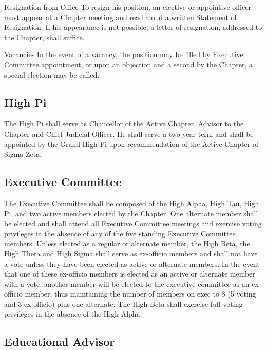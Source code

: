 \documentclass{article}
\begin{document}
\begin{subsubsectionList}
  \item {\titleStyle Resignation from Office\titleSuffix}
  To resign his position, an elective or appointive officer must appear at a
  Chapter meeting and read aloud a written Statement of Resignation. If his
  appearance is not possible, a letter of resignation, addressed to the Chapter,
  shall suffice.

  \item {\titleStyle Vacancies\titleSuffix}
  In the event of a vacancy, the position may be filled by Executive Committee
  appointment, or upon an objection and a second by the Chapter, a special
  election may be called.
\end{subsubsectionList}

\subsection{High Pi}

The High Pi shall serve as Chancellor of the Active Chapter, Advisor to the
Chapter and Chief Judicial Officer. He shall serve a two-year term and shall be
appointed by the Grand High Pi upon recommendation of the Active Chapter of
Sigma Zeta.

\subsection{Executive Committee}

The Executive Committee shall be composed of the High Alpha, High Tau, High Pi,
and two active members elected by the Chapter. One alternate member shall be
elected and shall attend all Executive Committee meetings and exercise voting
privileges in the absence of any of the five standing Executive Committee
members. Unless elected as a regular or alternate member, the High Beta, the
High Theta and High Sigma shall serve as ex-officio members and shall not have a
vote unless they have been elected as active or alternate members. In the event
that one of these ex-officio members is elected as an active or alternate member
with a vote, another member will be elected to the executive committee as an
ex-officio member, thus maintaining the number of members on exec to 8 (5 voting
and 3 ex-officio) plus one alternate. The High Beta shall exercise full voting
privileges in the absence of the High Alpha.

\subsection{Educational Advisor}
\end{document}
